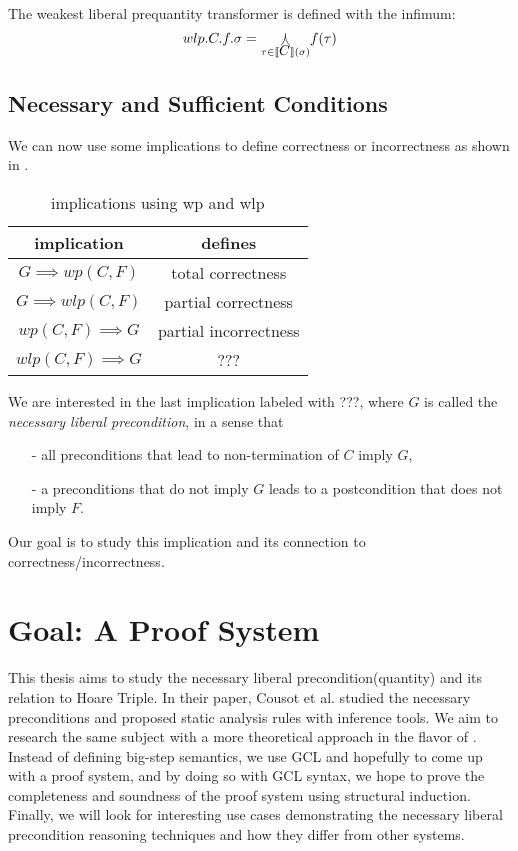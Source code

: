 \documentclass[adraft,hidelinks]{eptcs}
\begin{document}
The weakest liberal prequantity transformer is defined with the infimum: 
\[wlp.C.f.\sigma = \underset{\tau\in\bkt C(\sigma)}{\bigjoin} f(\tau)\]

\subsection{Necessary and Sufficient Conditions}
We can now use some implications to define correctness or incorrectness as shown in . 
\begin{table}\centering 
    \begin{tabular}{cc}
      \textbf{implication}&\textbf{defines}    \\ \hline
      $G\implies wp(C,F)$&   total correctness   \\
      $G\implies wlp(C,F)$&  partial correctness\\
      $wp(C,F)\implies G$&  partial incorrectness\\
      $wlp(C,F)\implies G$&  ???\\
    \end{tabular}
    \caption{implications using wp and wlp\cite{Zhang2022}}
    \label{tab:impl}
\end{table}    

We are interested in the last implication labeled with ???, where $G$ is called the \textit{necessary liberal precondition}, in a sense that 
\begin{itemize}
    \item [-] all preconditions that lead to non-termination of $C$ imply $G$, 
    \item [-] a preconditions that do not imply $G$ leads to a postcondition that does not imply $F$. 
\end{itemize}
Our goal is to study this implication and its connection to correctness/incorrectness. 


\section{Goal: A Proof System}
This thesis aims to study the necessary liberal precondition(quantity) and its relation to Hoare Triple. 
In their paper, Cousot et al. studied the necessary preconditions and proposed static analysis rules with inference tools. 
We aim to research the same subject with a more theoretical approach in the flavor of \cite{Vries2011}. 
Instead of defining big-step semantics, we use GCL and hopefully to come up with a proof system, 
and by doing so with GCL syntax, we hope to prove the completeness and soundness of the proof system using structural induction. 
Finally, we will look for interesting use cases demonstrating the necessary liberal precondition reasoning techniques and how they differ from other systems. 







\end{document}
